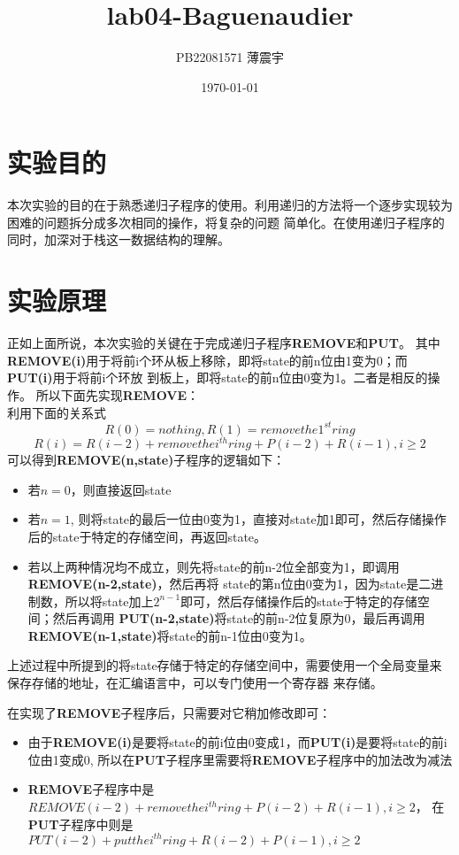 \documentclass{article}
\begin{document}
\title{lab04-Baguenaudier}
\author{PB22081571 薄震宇}
\date{\today}
\maketitle

\tableofcontents%

\section{实验目的}

本次实验的目的在于熟悉递归子程序的使用。利用递归的方法将一个逐步实现较为困难的问题拆分成多次相同的操作，将复杂的问题
简单化。在使用递归子程序的同时，加深对于栈这一数据结构的理解。

\section{实验原理}

正如上面所说，本次实验的关键在于完成递归子程序{\bfseries REMOVE}和{\bfseries PUT}。
其中{\bfseries REMOVE(i)}用于将前i个环从板上移除，即将state的前n位由1变为0；而{\bfseries PUT(i)}用于将前i个环放
到板上，即将state的前n位由0变为1。二者是相反的操作。
所以下面先实现{\bfseries REMOVE}：\\
利用下面的关系式
\[R(0) = nothing , R(1) = remove the 1^{st} ring\]
\[R(i) = R(i-2) + remove the i^{th} ring + P(i-2) + R(i-1) ,i \geqslant 2\]
可以得到{\bfseries REMOVE(n,state)}子程序的逻辑如下：

\begin{itemize}
    \item 若$n = 0$，则直接返回state
    \item 若$n = 1$, 则将state的最后一位由0变为1，直接对state加1即可，然后存储操作后的state于特定的存储空间，再返回state。
    \item 若以上两种情况均不成立，则先将state的前n-2位全部变为1，即调用{\bfseries REMOVE(n-2,state)}，然后再将
state的第n位由0变为1，因为state是二进制数，所以将state加上$2^{n-1}$即可，然后存储操作后的state于特定的存储空间；然后再调用
{\bfseries PUT(n-2,state)}将state的前n-2位复原为0，最后再调用{\bfseries REMOVE(n-1,state)}将state的前n-1位由0变为1。
\end{itemize}

上述过程中所提到的将state存储于特定的存储空间中，需要使用一个全局变量来保存存储的地址，在汇编语言中，可以专门使用一个寄存器
来存储。

在实现了{\bfseries REMOVE}子程序后，只需要对它稍加修改即可：
\begin{itemize}
	\item 由于{\bfseries REMOVE(i)}是要将state的前i位由0变成1，而{\bfseries PUT(i)}是要将state的前i位由1变成0,
所以在{\bfseries PUT}子程序里需要将{\bfseries REMOVE}子程序中的加法改为减法
	\item {\bfseries REMOVE}子程序中是$REMOVE(i-2) + remove the i^{th} ring + P(i-2) + R(i-1) ,i \geqslant 2$，
在{\bfseries PUT}子程序中则是$PUT(i-2) + put the i^{th} ring + R(i-2) + P(i-1) ,i \geqslant 2$
\end{itemize}
\end{document}
